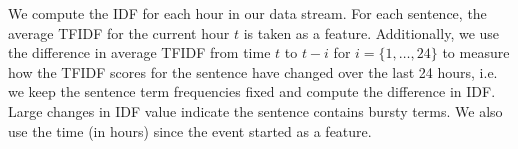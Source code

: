 We compute the IDF for each hour in our data stream. 
For each sentence, the average TFIDF for the current hour $t$ is taken as a 
feature. Additionally, we use the difference in average TFIDF from time $t$
to $t-i$ for $i = \{1, \ldots, 24\}$ to measure how the TFIDF scores for the 
sentence have changed over the last 24 hours, i.e. we keep the sentence
term frequencies fixed and compute the difference in IDF. Large changes
in IDF value indicate the sentence contains bursty terms.
We also use the time (in hours) since the event started as a feature.







